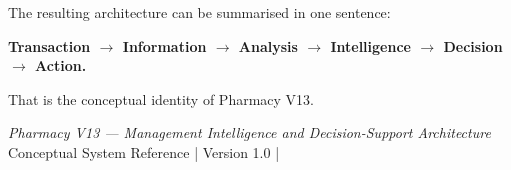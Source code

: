 \documentclass[11pt,a4paper]{article}
\begin{document}
The resulting architecture can be summarised in one sentence:

\begin{center}
\Large
\textbf{\color{navy}
Transaction $\rightarrow$ Information $\rightarrow$ Analysis
$\rightarrow$ Intelligence $\rightarrow$ Decision $\rightarrow$ Action.}
\end{center}

That is the conceptual identity of Pharmacy V13.

\vfill

\begin{center}
\sffamily\small
\textit{Pharmacy V13 --- Management Intelligence and Decision-Support Architecture}\\
Conceptual System Reference \quad | \quad Version 1.0 \quad | 
\end{center}
\end{document}
